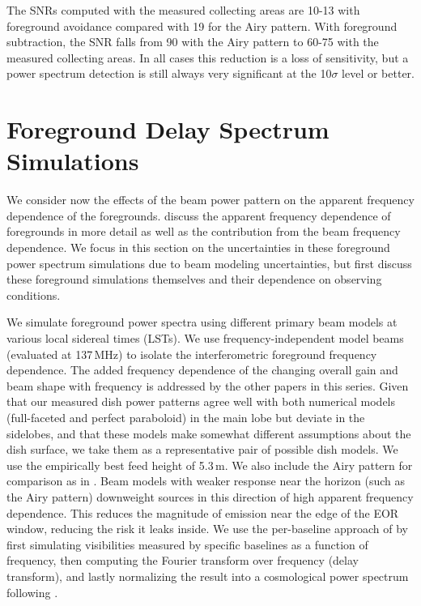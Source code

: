 The SNRs computed with the measured collecting areas are 10-13 with foreground avoidance compared with 19 for the Airy pattern. With foreground subtraction, the SNR falls from 90 with the Airy pattern to 60-75 with the measured collecting areas. In all cases this reduction is a loss of sensitivity, but a power spectrum detection is still always very significant at the 10$\sigma$ level or better.

\section{Foreground Delay Spectrum Simulations}
\label{sec:foregrounds}

We consider now the effects of the beam power pattern on the apparent frequency dependence of the foregrounds. \citet{nithya16} discuss the apparent frequency dependence of foregrounds in more detail as well as the contribution from the beam frequency dependence. We focus in this section on the uncertainties in these foreground power spectrum simulations due to beam modeling uncertainties, but first discuss these foreground simulations themselves and their dependence on observing conditions. 

We simulate foreground power spectra using different primary beam models at various local sidereal times (LSTs). We use frequency-independent model beams (evaluated at 137\,MHz) to isolate the interferometric foreground frequency dependence. The added frequency dependence of the changing overall gain and beam shape with frequency is addressed by the other papers in this series. Given that our measured dish power patterns agree well with both numerical models (full-faceted and perfect paraboloid) in the main lobe but deviate in the sidelobes, and that these models make somewhat different assumptions about the dish surface, we take them as a representative pair of possible dish models. We use the empirically best feed height of 5.3\,m. We also include the Airy pattern for comparison as in \citet{nithya15}. Beam models with weaker response near the horizon (such as the Airy pattern) downweight sources in this direction of high apparent frequency dependence. This reduces the magnitude of emission near the edge of the EOR window, reducing the risk it leaks inside. We use the per-baseline approach of \citet{parsons12a,parsons12b} by first simulating visibilities measured by specific baselines as a function of frequency, then computing the Fourier transform over frequency (delay transform), and lastly normalizing the result into a cosmological power spectrum following \citet{nithya15}. 

